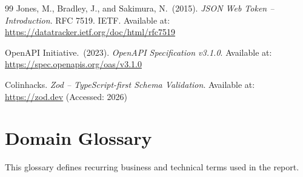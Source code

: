 \documentclass[12pt,a4paper]{report}
\begin{document}
\begin{thebibliography}{99}
    Jones, M., Bradley, J., and Sakimura, N.\ (2015).
    \textit{JSON Web Token -- Introduction}.
    RFC 7519. IETF.
    Available at: \url{https://datatracker.ietf.org/doc/html/rfc7519}

    OpenAPI Initiative.\ (2023).
    \textit{OpenAPI Specification v3.1.0}.
    Available at: \url{https://spec.openapis.org/oas/v3.1.0}

    Colinhacks.
    \textit{Zod -- TypeScript-first Schema Validation}.
    Available at: \url{https://zod.dev}
    (Accessed: 2026)

\end{thebibliography}

\appendix

\chapter{Domain Glossary}
\label{app:glossary}

This glossary defines recurring business and technical terms used in the report.
\end{document}
